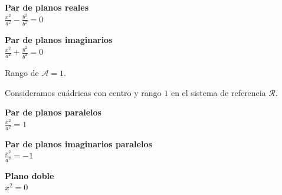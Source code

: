 \begin{minipage}[c]{0.45\textwidth}
  {\bf Par de planos reales}\vspace{1em}\\
  $\displaystyle \frac{{x}^2}{a^2} - \frac{{y}^2}{b^2}=0$
\end{minipage}\hfill\vspace{1em}
\begin{minipage}[]{0.45\textwidth}
\hfill
\end{minipage}

\begin{minipage}[c]{0.45\textwidth}
  {\bf Par de planos imaginarios}\vspace{1em}\\
  $\displaystyle \frac{{x}^2}{a^2} + \frac{{y}^2}{b^2}=0$
\end{minipage}\hfill\vspace{1em}
\begin{minipage}[]{0.45\textwidth}
\hfill
\end{minipage}

\vspace{1em}

Rango de $\mathcal A = 1$.

Consideramos cuádricas con centro y rango $1$ en el sistema de referencia $\mathcal R$.

\vspace{1em}

\begin{minipage}[c]{0.45\textwidth}
  {\bf Par de planos paralelos}\vspace{1em}\\
  $\displaystyle \frac{{x}^2}{a^2}=1$
\end{minipage}\hfill\vspace{1em}
\begin{minipage}[]{0.45\textwidth}
\hfill
\end{minipage}

\begin{minipage}[c]{0.45\textwidth}
  {\bf Par de planos imaginarios paralelos}\vspace{1em}\\
  $\displaystyle \frac{{x}^2}{a^2} =-1$
\end{minipage}\hfill\vspace{1em}
\begin{minipage}[]{0.45\textwidth}
\hfill
\end{minipage}

\begin{minipage}[c]{0.45\textwidth}
  {\bf Plano doble}\vspace{1em}\\
  $\displaystyle {{x}^2} = 0$
\end{minipage}\hfill\vspace{1em}
\begin{minipage}[]{0.45\textwidth}
\hfill
\end{minipage}


